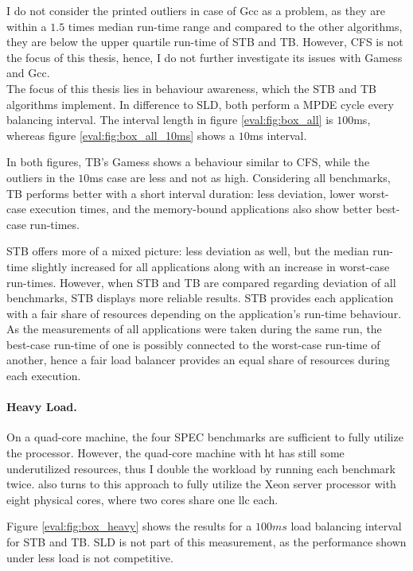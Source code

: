 I do not consider the printed outliers in case of Gcc as a problem, as
they are within a $1.5$ times median run-time range and compared to the other
algorithms, they are below the upper quartile run-time of STB and TB.
However, CFS is not the focus of this thesis, hence, I do not further
investigate its issues with Gamess and Gcc.
\\

The focus of this thesis lies in behaviour awareness, which the STB and TB
algorithms implement.
In difference to SLD, both perform a MPDE cycle every balancing interval.
The interval length in figure \ref{eval:fig:box_all} is $100$ms, whereas figure
\ref{eval:fig:box_all_10ms} shows a $10$ms interval.

In both figures, TB's Gamess shows a behaviour similar to CFS, while the
outliers in the $10$ms case are less and not as high.
Considering all benchmarks, TB performs better with a short interval duration:
less deviation, lower worst-case execution times, and the memory-bound
applications also show better best-case run-times.

STB offers more of a mixed picture: less deviation as well, but the median
run-time slightly increased for all applications along with an increase in
worst-case run-times.
However, when STB and TB are compared regarding deviation of all benchmarks,
STB displays more reliable results.
STB provides each application with a fair share of resources depending on the
application's run-time behaviour.
As the measurements of all applications were taken during the same run, the
best-case run-time of one is possibly connected to the worst-case run-time of
another, hence a fair load balancer provides an equal share of resources
during each execution.


\paragraph{Heavy Load.}
On a quad-core machine, the four SPEC benchmarks are sufficient to fully
utilize the processor.
However, the quad-core machine with \gls{ht} has still some underutilized
resources, thus I double the workload by running each benchmark twice.
\cite{zhuravlev_addressing_2010} also turns to this approach to fully utilize
the Xeon server processor with eight physical cores, where two cores share
one \gls{llc} each.

Figure \ref{eval:fig:box_heavy} shows the results for a $100ms$ load balancing
interval for STB and TB. SLD is not part of this measurement, as the
performance shown under less load is not competitive.

